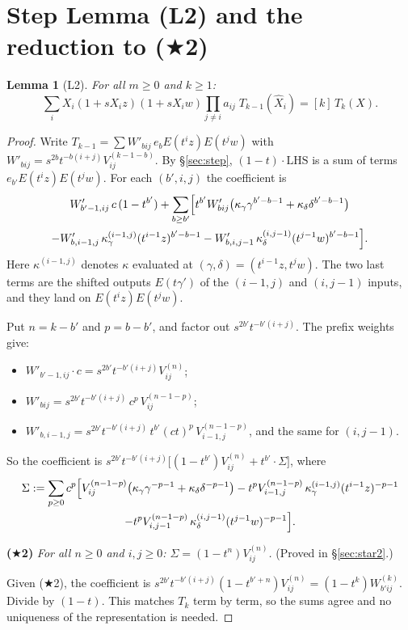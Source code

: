 \documentclass[11pt]{amsart}
\newtheorem{lemma}[theorem]{Lemma}
\theoremstyle{remark}
\newcommand{\hX}{\widehat{X}}
\begin{document}
\section{Step Lemma (L2) and the reduction to \texorpdfstring{($\bigstar$2)}{(*2)}}\label{sec:L2}

\begin{lemma}[L2]\label{lem:L2}
For all $m\ge0$ and $k\ge1$:
\[
\sum_iX_i(1+sX_iz)(1+sX_iw)\prod_{j\ne i}a_{ij}\;T_{k-1}(\hX_i)=[k]\,T_k(X).
\]
\end{lemma}
\begin{proof}
Write $T_{k-1}=\sum W'_{bij}\,e_bE(t^iz)E(t^jw)$ with $W'_{bij}=s^{2b}t^{-b(i+j)}V^{(k-1-b)}_{ij}$. By \S\ref{sec:step}, $(1-t)\cdot\mathrm{LHS}$ is a sum of terms $e_{b'}E(t^iz)E(t^jw)$. For each $(b',i,j)$ the coefficient is
\begin{multline*}
W'_{b'-1,ij}\,c\,(1-t^{b'})+\sum_{b\ge b'}\Bigl[t^{b'}W'_{bij}\bigl(\kappa_\gamma\gamma^{b'-b-1}+\kappa_\delta\delta^{b'-b-1}\bigr)\\
-W'_{b,i-1,j}\,\kappa_\gamma^{(i-1,j)}(t^{i-1}z)^{b'-b-1}-W'_{b,i,j-1}\,\kappa_\delta^{(i,j-1)}(t^{j-1}w)^{b'-b-1}\Bigr].
\end{multline*}
Here $\kappa^{(i-1,j)}$ denotes $\kappa$ evaluated at $(\gamma,\delta)=(t^{i-1}z,t^jw)$. The two last terms are the shifted outputs $E(t\gamma')$ of the $(i-1,j)$ and $(i,j-1)$ inputs, and they land on $E(t^iz)E(t^jw)$.

Put $n=k-b'$ and $p=b-b'$, and factor out $s^{2b'}t^{-b'(i+j)}$. The prefix weights give:
\begin{itemize}
\item $W'_{b'-1,ij}\cdot c=s^{2b'}t^{-b'(i+j)}V^{(n)}_{ij}$;
\item $W'_{bij}=s^{2b'}t^{-b'(i+j)}\,c^p\,V^{(n-1-p)}_{ij}$;
\item $W'_{b,i-1,j}=s^{2b'}t^{-b'(i+j)}\,t^{b'}(ct)^p\,V^{(n-1-p)}_{i-1,j}$, and the same for $(i,j-1)$.
\end{itemize}
So the coefficient is $s^{2b'}t^{-b'(i+j)}\bigl[(1-t^{b'})V^{(n)}_{ij}+t^{b'}\cdot\Sigma\bigr]$, where
\begin{multline*}
\Sigma:=\sum_{p\ge0}c^p\Bigl[V^{(n-1-p)}_{ij}\bigl(\kappa_\gamma\gamma^{-p-1}+\kappa_\delta\delta^{-p-1}\bigr)
-t^pV^{(n-1-p)}_{i-1,j}\,\kappa_\gamma^{(i-1,j)}(t^{i-1}z)^{-p-1}\\
-t^pV^{(n-1-p)}_{i,j-1}\,\kappa_\delta^{(i,j-1)}(t^{j-1}w)^{-p-1}\Bigr].
\end{multline*}

\medskip\noindent\textbf{($\bigstar$2)} \emph{For all $n\ge0$ and $i,j\ge0$: $\Sigma=(1-t^n)V^{(n)}_{ij}$.} (Proved in \S\ref{sec:star2}.)

\medskip
Given ($\bigstar$2), the coefficient is $s^{2b'}t^{-b'(i+j)}(1-t^{b'+n})V^{(n)}_{ij}=(1-t^k)W^{(k)}_{b'ij}$. Divide by $(1-t)$. This matches $T_k$ term by term, so the sums agree and no uniqueness of the representation is needed.
\end{proof}
\end{document}

